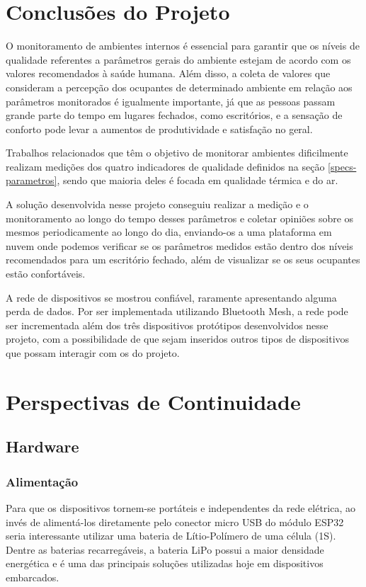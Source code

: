 \documentclass[../monografia.tex]{subfiles}
\begin{document}
\section{Conclusões do Projeto}

O monitoramento de ambientes internos é essencial para garantir que os níveis de qualidade referentes a parâmetros gerais do ambiente estejam de acordo com os valores recomendados à saúde humana. Além disso, a coleta de valores que consideram a percepção dos ocupantes de determinado ambiente em relação aos parâmetros monitorados é igualmente importante, já que as pessoas passam grande parte do tempo em lugares fechados, como escritórios, e a sensação de conforto pode levar a aumentos de produtividade e satisfação no geral.

Trabalhos relacionados que têm o objetivo de monitorar ambientes dificilmente realizam medições dos quatro indicadores de qualidade definidos na seção \ref{specs-parametros}, sendo que maioria deles é focada em qualidade térmica e do ar.

A solução desenvolvida nesse projeto conseguiu realizar a medição e o monitoramento ao longo do tempo desses parâmetros e coletar opiniões sobre os mesmos periodicamente ao longo do dia, enviando-os a uma plataforma em nuvem onde podemos verificar se os parâmetros medidos estão dentro dos níveis recomendados para um escritório fechado, além de visualizar se os seus ocupantes estão confortáveis.

A rede de dispositivos se mostrou confiável, raramente apresentando alguma perda de dados. Por ser implementada utilizando Bluetooth Mesh, a rede pode ser incrementada além dos três dispositivos protótipos desenvolvidos nesse projeto, com a possibilidade de que sejam inseridos outros tipos de dispositivos que possam interagir com os do projeto. 

\section{Perspectivas de Continuidade}
\subsection{Hardware}
\subsubsection{Alimentação}

Para que os dispositivos tornem-se portáteis e independentes da rede elétrica, ao invés de alimentá-los diretamente pelo conector micro USB do módulo ESP32 seria interessante utilizar uma bateria de Lítio-Polímero de uma célula (1S). Dentre as baterias recarregáveis, a bateria LiPo possui a maior densidade energética e é uma das principais soluções utilizadas hoje em dispositivos embarcados. %
\end{document}
